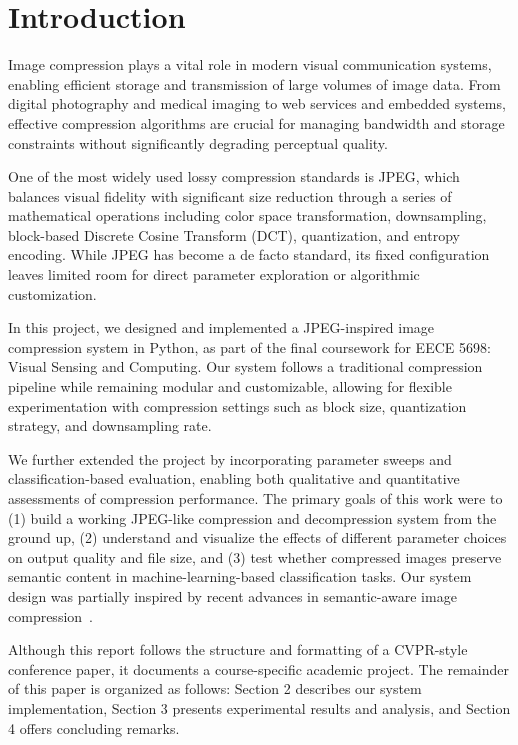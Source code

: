 \section{Introduction}
\label{sec:intro}

Image compression plays a vital role in modern visual communication systems, enabling efficient storage and transmission of large volumes of image data. From digital photography and medical imaging to web services and embedded systems, effective compression algorithms are crucial for managing bandwidth and storage constraints without significantly degrading perceptual quality.

One of the most widely used lossy compression standards is JPEG, which balances visual fidelity with significant size reduction through a series of mathematical operations including color space transformation, downsampling, block-based Discrete Cosine Transform (DCT), quantization, and entropy encoding. While JPEG has become a de facto standard, its fixed configuration leaves limited room for direct parameter exploration or algorithmic customization.

In this project, we designed and implemented a JPEG-inspired image compression system in Python, as part of the final coursework for EECE 5698: Visual Sensing and Computing. Our system follows a traditional compression pipeline while remaining modular and customizable, allowing for flexible experimentation with compression settings such as block size, quantization strategy, and downsampling rate. 

We further extended the project by incorporating parameter sweeps and classification-based evaluation, enabling both qualitative and quantitative assessments of compression performance. The primary goals of this work were to (1) build a working JPEG-like compression and decompression system from the ground up, (2) understand and visualize the effects of different parameter choices on output quality and file size, and (3) test whether compressed images preserve semantic content in machine-learning-based classification tasks. Our system design was partially inspired by recent advances in semantic-aware image compression~\cite{semanticDiffusion2023}.

Although this report follows the structure and formatting of a CVPR-style conference paper, it documents a course-specific academic project. The remainder of this paper is organized as follows: Section 2 describes our system implementation, Section 3 presents experimental results and analysis, and Section 4 offers concluding remarks.
